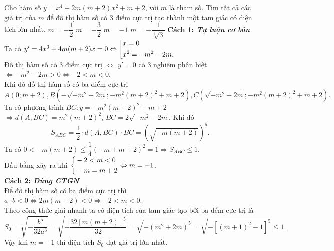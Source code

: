 \begin{vd}%
	Cho hàm số $y=x^4+2m(m+2)x^2+m+2$, với $m$ là tham số. Tìm tất cả các giá trị của $m$ để đồ thị hàm số có $3$ điểm cực trị tạo thành một tam giác có diện tích lớn nhất.
	\choice
	{$m=-\dfrac{1}{2}$}
	{$m=-\dfrac{3}{2}$}
	{\True $m=-1$}
	{$m=-\dfrac{1}{\sqrt[3]{3}}$}
	\loigiai
	{\textbf{Cách 1: \textit{Tự luận cơ bản}}\\
		Ta có $y'=4x^3+4m(m+2)x=0\Leftrightarrow\left[\begin{aligned}&x=0\\&x^2=-m^2-2m.\end{aligned}\right.$\\
		Đồ thị hàm số có $3$ điểm cực trị $\Leftrightarrow$ $y'=0$ có $3$ nghiệm phân biệt\\
		$\Leftrightarrow -m^2-2m>0\Leftrightarrow -2<m<0$.\\
		Khi đó đồ thị hàm số có ba điểm cực trị
		$$A(0; m+2), B\left(-\sqrt{-m^2-2m}; -m^2(m+2)^2+m+2\right), C\left(\sqrt{-m^2-2m}; -m^2(m+2)^2+m+2\right).$$
		Ta có phương trình $BC: y=-m^2(m+2)^2+m+2$ $\Rightarrow d(A, BC)=m^2(m+2)^2$, $BC=2\sqrt{-m^2-2m}$. Khi đó
		$$S_{ABC}=\dfrac{1}{2}\cdot d(A, BC)\cdot BC=\left(\sqrt{-m(m+2)}\right)^5.$$
		Ta có $0<-m(m+2)\leq \dfrac{1}{4}(-m+m+2)^2=1\Rightarrow S_{ABC}\leq 1$.\\
		Dấu bằng xảy ra khi $\left\{\begin{aligned}&-2<m<0\\&-m=m+2\end{aligned}\right.\Leftrightarrow m=-1$.\\
		\textbf{Cách 2: \textit{Dùng CTGN}}\\
		Để đồ thị hàm số có ba điểm cực trị thì $a\cdot b<0\Leftrightarrow2m(m+2)<0\Leftrightarrow-2<m<0$.\\
		Theo công thức giải nhanh ta có diện tích của tam giác tạo bởi ba đểm cực trị là $$S_0=\sqrt{-\dfrac{b^5}{32a^3}}=\sqrt{-\dfrac{32\left[m(m+2)\right]^5}{32}}=\sqrt{-\left(m^2+2m\right)^5}=\sqrt{-\left[(m+1)^2-1\right]^5}\le1.$$
		Vậy khi $m=-1$ thì diện tích $S_0$ đạt giá trị lớn nhất.	
	}
\end{vd}

